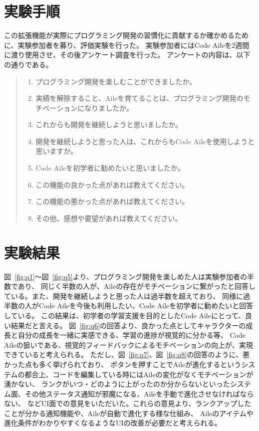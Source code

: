 \documentclass[12pt,twoside]{jbook}
\begin{document}
\section{実験手順}
 この拡張機能が実際にプログラミング開発の習慣化に貢献するか確かめるために、実験参加者を募り、評価実験を行った。
実験参加者にはCode Aileを2週間に渡り使用させ、その後アンケート調査を行った。
アンケートの内容は、以下の通りである。
\begin{quote}
	\begin{enumerate}
    \item プログラミング開発を楽しむことができましたか。
    \item 実績を解除すること、Aileを育てることは、プログラミング開発のモチベーションになりましたか。
    \item これからも開発を継続しようと思いましたか。
    \item 開発を継続しようと思った人は、これからもCode Aileを使用しようと思いますか。
    \item Code Aileを初学者に勧めたいと思いましたか。
    \item この機能の良かった点があれば教えてください。
    \item この機能の悪かった点があれば教えてください。
    \item その他、感想や要望があれば教えてください。
	\end{enumerate}
\end{quote}

\section{実験結果}
 図~\ref{fig:q1}〜図~\ref{fig:q5}より、プログラミング開発を楽しめた人は実験参加者の半数であり、
同じく半数の人が、Aileの存在がモチベーションに繋がったと回答している。また、開発を継続しようと思った人は過半数を超えており、
同様に過半数の人がCode Aileを今後も利用したい、Code Aileを初学者に勧めたいと回答している。
この結果は、初学者の学習支援を目的としたCode Aileにとって、良い結果だと言える。
 図~\ref{fig:q6}の回答より、良かった点としてキャラクターの成長と自分の成長を一緒に実感できる、学習の進捗が視覚的に分かる等、
Code Aileの狙いである、視覚的フィードバックによるモチベーションの向上が、実現できていると考えられる。
 ただし、図~\ref{fig:q7}、図~\ref{fig:q8}の回答のように、悪かった点も多く挙げられており、
ボタンを押すことでAileが進化するというシステムの都合上、コードを編集している時にはAileの変化がなくモチベーションが湧かない、
ランクがいつ・どのように上がったのか分からないといったシステム面、その他ステータス通知が邪魔になる、Aileを手動で進化させなければならない、
などUI面での意見をいただいた。これらの意見より、ランクアップしたことが分かる通知機能や、Aileが自動で進化する様な仕組み、
Aileのアイテムや進化条件がわかりやすくなるようなUIの改善が必要だと考えられる。
\end{document}
